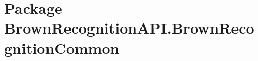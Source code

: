 \hypertarget{namespace_brown_recognition_a_p_i_1_1_brown_recognition_common}{
\section{\-Package \-Brown\-Recognition\-A\-P\-I.\-Brown\-Recognition\-Common}
\label{namespace_brown_recognition_a_p_i_1_1_brown_recognition_common}
}
